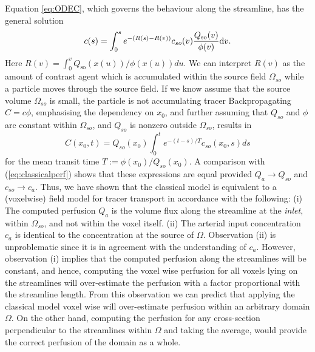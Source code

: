 \documentclass[paper=a4, fontsize=11pt,parskip=half,headings=small]{scrartcl}
\newcommand{\Qso}{Q_{\mathrm{so}}}
\begin{document}
Equation \eqref{eq:ODEC}, which governs the behaviour along the streamline, has the general solution
\begin{equation}\label{eq:Sol}
	c(s) = \int_{0}^{s} e^{-(R(s)-R(v))}c_{so}(v)\frac{\Qso(v)}{\phi(v)} \diff v.
\end{equation}
Here $R(v)=\int_{0}^v\Qso(x(u))/\phi(x(u)) d u$.
We can interpret $R(v)$ as the amount of contrast agent which is accumulated within the source field $\Omega_{so}$ while a particle moves through the source field.
If we know assume that the source volume $\Omega_{so}$ is small, the particle is not accumulating tracer
Backpropagating $C = c \phi$, emphasising the dependency on $x_0$, and further assuming that $Q_{so}$ and $\phi$ are constant within $\Omega_{so}$, and $Q_{so}$ is nonzero outside $\Omega_{so}$, results in
\begin{equation}
C(x_0,t) = Q_{so}(x_0) \int_{0}^t e^{-(t - s)/T}c_{so}(x_0,s) ds
\label{eq:Cpdeclassic}
\end{equation}
for the mean transit time $T := \phi(x_0) / Q_{so}(x_0)$.
A comparison with (\ref{eq:classicalperf}) shows that these expressions are equal provided $Q_a \rightarrow Q_{so}$ and $c_{so} \rightarrow c_{a}$. Thus, we have shown that the classical model is equivalent to a (voxelwise) field model for tracer transport in accordance with the following: (i) The computed perfusion $Q_a$ is the volume flux along the streamline at the \textit{inlet}, within $\Omega_{so}$, and not within the voxel itself. (ii) The arterial input concentration $c_a$ is identical to the concentration at the source of $\Omega$. Observation (ii) is unproblematic since it is in agreement with the understanding of $c_a$. However, observation (i) implies that the computed perfusion along the streamlines will be constant, and hence, computing the voxel wise perfusion for all voxels lying on the streamlines will over-estimate the perfusion with a factor proportional with the streamline length. From this observation we can predict that applying the classical model voxel wise will over-estimate perfusion within an arbitrary domain $\Omega$. On the other hand, computing the perfusion for any cross-section perpendicular to the streamlines within $\Omega$ and taking the average, would provide the correct perfusion of the domain as a whole.
\end{document}
